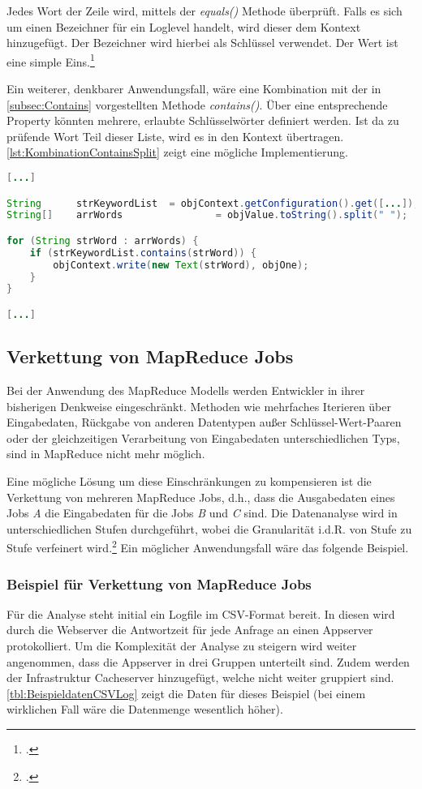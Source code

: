 Jedes Wort der Zeile wird, mittels der \textit{equals()} Methode überprüft. Falls es sich um einen Bezeichner für ein Loglevel handelt, wird dieser dem Kontext hinzugefügt. Der Bezeichner wird hierbei als Schlüssel verwendet. Der Wert ist eine simple Eins.\footcite[Vgl.][S. 121 f.]{Freiknecht.2014}

Ein weiterer, denkbarer Anwendungsfall, wäre eine Kombination mit der in \autoref{subsec:Contains} vorgestellten Methode \textit{contains()}. Über eine entsprechende Property könnten mehrere, erlaubte Schlüsselwörter definiert werden. Ist da zu prüfende Wort Teil dieser Liste, wird es in den Kontext übertragen. \autoref{lst:KombinationContainsSplit} zeigt eine mögliche Implementierung. \\

\begin{lstlisting}[language=Java,caption=Kombination von \textit{contains()} und \textit{split()},label=lst:KombinationContainsSplit]
[...]

String		strKeywordList	= objContext.getConfiguration().get([...]);
String[]	arrWords 				= objValue.toString().split(" ");

for (String strWord : arrWords) {
	if (strKeywordList.contains(strWord)) {
		objContext.write(new Text(strWord), objOne);
	}
}

[...]
\end{lstlisting}

\subsection{Verkettung von MapReduce Jobs}
Bei der Anwendung des MapReduce Modells werden Entwickler in ihrer bisherigen Denkweise eingeschränkt. Methoden wie mehrfaches Iterieren über Eingabedaten, Rückgabe von anderen Datentypen außer Schlüssel-Wert-Paaren oder der gleichzeitigen Verarbeitung von Eingabedaten unterschiedlichen Typs, sind in MapReduce nicht mehr möglich.

Eine mögliche Lösung um diese Einschränkungen zu kompensieren ist die Verkettung von mehreren MapReduce Jobs, d.h., dass die Ausgabedaten eines Jobs \textit{A} die Eingabedaten für die Jobs \textit{B} und \textit{C} sind. Die Datenanalyse wird in unterschiedlichen Stufen durchgeführt, wobei die Granularität i.d.R. von Stufe zu Stufe verfeinert wird.\footcite[Vgl.][S. 94]{Freiknecht.2014} Ein möglicher Anwendungsfall wäre das folgende Beispiel.

\subsubsection{Beispiel für Verkettung von MapReduce Jobs}
Für die Analyse steht initial ein Logfile im CSV-Format bereit. In diesen wird durch die Webserver die Antwortzeit für jede Anfrage an einen Appserver protokolliert. Um die Komplexität der Analyse zu steigern wird weiter angenommen, dass die Appserver in drei Gruppen unterteilt sind. Zudem werden der Infrastruktur Cacheserver hinzugefügt, welche nicht weiter gruppiert sind. \autoref{tbl:BeispieldatenCSVLog} zeigt die Daten für dieses Beispiel (bei einem wirklichen Fall wäre die Datenmenge wesentlich höher).

